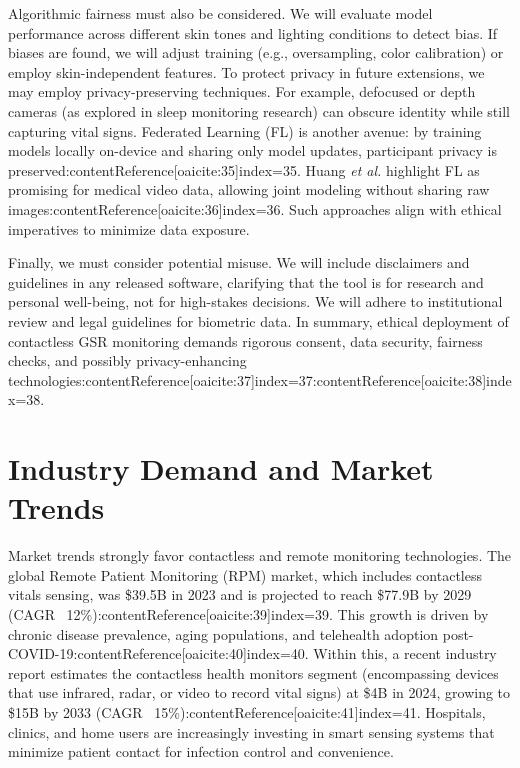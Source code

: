 \documentclass[12pt]{article}
\begin{document}
    Algorithmic fairness must also be considered. We will evaluate model performance across different skin tones and lighting conditions to detect bias. If biases are found, we will adjust training (e.g., oversampling, color calibration) or employ skin-independent features. To protect privacy in future extensions, we may employ privacy-preserving techniques. For example, defocused or depth cameras (as explored in sleep monitoring research) can obscure identity while still capturing vital signs. Federated Learning (FL) is another avenue: by training models locally on-device and sharing only model updates, participant privacy is preserved:contentReference[oaicite:35]{index=35}. Huang \emph{et al.} highlight FL as promising for medical video data, allowing joint modeling without sharing raw images:contentReference[oaicite:36]{index=36}. Such approaches align with ethical imperatives to minimize data exposure.

    Finally, we must consider potential misuse. We will include disclaimers and guidelines in any released software, clarifying that the tool is for research and personal well-being, not for high-stakes decisions. We will adhere to institutional review and legal guidelines for biometric data. In summary, ethical deployment of contactless GSR monitoring demands rigorous consent, data security, fairness checks, and possibly privacy-enhancing technologies:contentReference[oaicite:37]{index=37}:contentReference[oaicite:38]{index=38}.


    \section{Industry Demand and Market Trends}
    Market trends strongly favor contactless and remote monitoring technologies. The global Remote Patient Monitoring (RPM) market, which includes contactless vitals sensing, was \$39.5B in 2023 and is projected to reach \$77.9B by 2029 (CAGR ~12\%):contentReference[oaicite:39]{index=39}. This growth is driven by chronic disease prevalence, aging populations, and telehealth adoption post-COVID-19:contentReference[oaicite:40]{index=40}. Within this, a recent industry report estimates the contactless health monitors segment (encompassing devices that use infrared, radar, or video to record vital signs) at \$4B in 2024, growing to \$15B by 2033 (CAGR ~15\%):contentReference[oaicite:41]{index=41}. Hospitals, clinics, and home users are increasingly investing in smart sensing systems that minimize patient contact for infection control and convenience.
\end{document}
